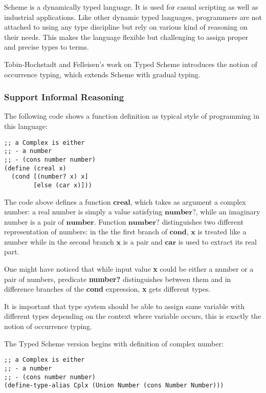 Scheme is a dynamically typed language.
It is used for casual scripting as well as industrial applications.
Like other dynamic typed languages, programmers are not attached to using any
type discipline but rely on various kind of reasoning on their needs.
This makes the language flexible but challenging to assign proper and precise types to terms.

Tobin-Hochstadt and Felleisen's work on Typed Scheme
introduces the notion of occurrence typing, which
extends Scheme with gradual typing.


\subsubsection{Support Informal Reasoning}

The following code shows a function definition as typical style of programming in this language:

\begin{verbatim}
;; a Complex is either
;; - a number
;; - (cons number number)
(define (creal x)
  (cond [(number? x) x]
        [else (car x)]))
\end{verbatim}

The code above defines a function $\textbf{creal}$, which takes as argument
a complex number: a real number is simply a value satisfying $\textbf{number?}$,
while an imaginary number is a pair of $\textbf{number}$.
Function $\textbf{number?}$ distinguishes two different representation of numbers:
in the the first branch of $\textbf{cond}$, $\textbf{x}$ is treated like a number
while in the second branch $\textbf{x}$ is a pair and $\textbf{car}$ is used
to extract its real part.

One might have noticed that
while input value \textbf{x} could be either a number or a pair of numbers,
predicate \textbf{number?} distinguishes between them and
in difference branches of the \textbf{cond} expression, \textbf{x} gets different types.

It is important that type system should be able to assign same variable with different
types depending on the context where variable occurs, this is exactly the notion of
occurrence typing.

The Typed Scheme version begins with definition of complex number:

\begin{verbatim}
;; a Complex is either
;; - a number
;; - (cons number number)
(define-type-alias Cplx (Union Number (cons Number Number)))
\end{verbatim}

